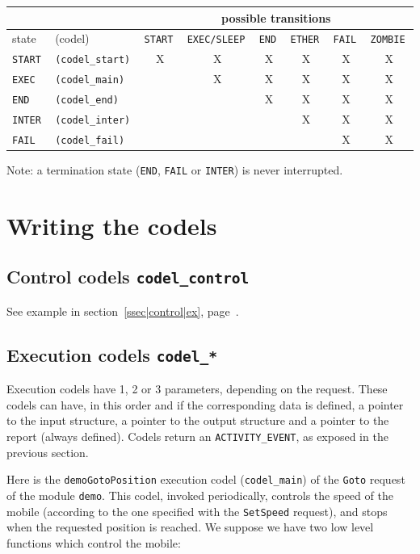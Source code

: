 \bigbreak

{\small\begin{tabular}{|ll||c|c|c|c|c|c|}
\cline{3-8}
\multicolumn{2}{c}{} & \multicolumn{6}{|c|}{possible transitions} \\
\hline
state & (codel) & \tt START & \tt EXEC/SLEEP & \tt END & \tt ETHER & \tt FAIL & \tt ZOMBIE \\
\hline
\tt START  & \tt (codel\_start)	& X & X & X & X & X & X \\
\tt EXEC   & \tt (codel\_main) 	&   & X & X & X & X & X \\
\tt END    & \tt (codel\_end) 	&   &   & X & X & X & X \\
\tt INTER  & \tt (codel\_inter) &   &   &   & X & X & X \\
\tt FAIL   & \tt (codel\_fail) 	&   &   &   &   & X & X \\
\hline
\end{tabular}}

Note: a termination state (\texttt{END}, \texttt{FAIL} or \texttt{INTER}) is never
interrupted.



\section{Writing the codels}
\label{sec|codels|writing}


\subsection{Control codels  \texttt{codel\_control}}

See        example            in           section~\ref{ssec|control|ex},
page~\pageref{ssec|control|ex}.

\subsection{Execution codels  \texttt{codel\_*}}

Execution  codels have 1,  2 or 3  parameters,  depending on the request.
These codels can have,  in this order and   if the corresponding  data is
defined,  a pointer to  the   input structure,  a pointer  to  the output
structure and a pointer to the report (always  defined). Codels return an
\texttt{ACTIVITY\_EVENT}, as exposed in the previous section.

Here is the \texttt{demoGotoPosition}  execution codel (\texttt{codel\_main})
of the \texttt{Goto} request of the module \texttt{demo}. This codel,
invoked periodically, controls the speed of the mobile (according to the
one specified with the \texttt{SetSpeed} request), and stops when the
requested position is reached. We suppose we have two low level functions
which control the mobile:

